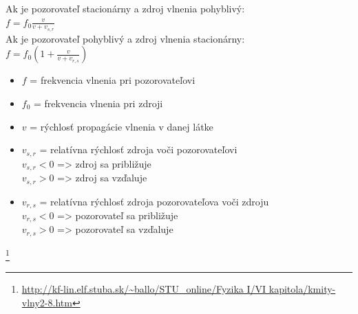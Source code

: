 \documentclass[12pt]{article}
\begin{document}
	Ak je pozorovateľ stacionárny a zdroj vlnenia pohyblivý:\\[1em]
	$f = f_0\frac{v}{v + v_{s,r}}$\\[1em]
	Ak je pozorovateľ pohyblivý a zdroj vlnenia stacionárny:\\[1em]
	$f = f_0(1 + \frac{v}{v + v_{r,s}})$\\
	\begin{itemize}
		\item $f$ = frekvencia vlnenia pri pozorovateľovi
		\item $f_0$ = frekvencia vlnenia pri zdroji
		\item $v$ = rýchlosť propagácie vlnenia v danej látke
		\item $v_{s,r}$ = relatívna rýchlosť zdroja voči pozorovateľovi\\
		$v_{s,r} < 0$ => zdroj sa približuje\\
		$v_{s,r} > 0$ => zdroj sa vzďaluje\\
		\item $v_{r,s}$ = relatívna rýchlosť zdroja pozorovateľova voči zdroju\\
			$v_{r,s} < 0$ => pozorovateľ sa približuje\\
			$v_{r,s} > 0$ => pozorovateľ sa vzďaluje\\
	\end{itemize}


	\footnote{\url{http://kf-lin.elf.stuba.sk/~ballo/STU_online/Fyzika I/VI kapitola/kmity-vlny2-8.htm}}
\end{document}
